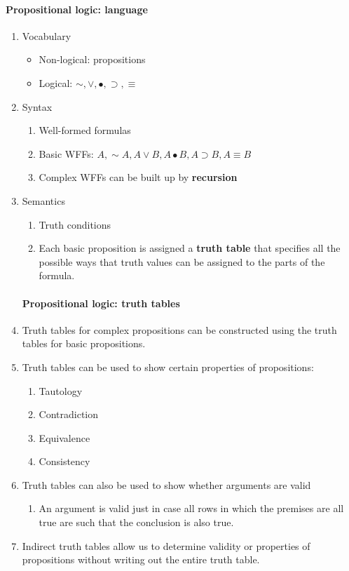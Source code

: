 \documentclass[10pt,landscape]{article}
\begin{document}
\begin{multicols}{2}
 
\paragraph{Propositional logic: language}
  \begin{enumerate}
   \item Vocabulary
    \begin{itemize}
     \item Non-logical: propositions
     \item Logical: $\sim, \vee, \bullet, \supset, \equiv$
    \end{itemize}
   \item Syntax
    \begin{enumerate}
     \item Well-formed formulas
     \item Basic WFFs: $A, \sim\! A, A \vee B, A \bullet B, A \supset B, A \equiv B$
     \item Complex WFFs can be built up by \textbf{recursion}
    \end{enumerate}
   \item Semantics
    \begin{enumerate}
     \item Truth conditions
     \item Each basic proposition is assigned a \textbf{truth table} that specifies all the possible ways that truth values can be assigned to the parts of the formula.
    \end{enumerate}
  
\paragraph{Propositional logic: truth tables}
   \item Truth tables for complex propositions can be constructed using the truth tables for basic propositions.
   \item Truth tables can be used to show certain properties of propositions:
    \begin{enumerate}
     \item Tautology
     \item Contradiction
     \item Equivalence
     \item Consistency
    \end{enumerate}
   \item Truth tables can also be used to show whether arguments are valid
    \begin{enumerate}
     \item An argument is valid just in case all rows in which the premises are all true are such that the conclusion is also true.
    \end{enumerate}
   \item Indirect truth tables allow us to determine validity or properties of propositions without writing out the entire truth table.
  

\end{enumerate}
\end{multicols}
\end{document}
